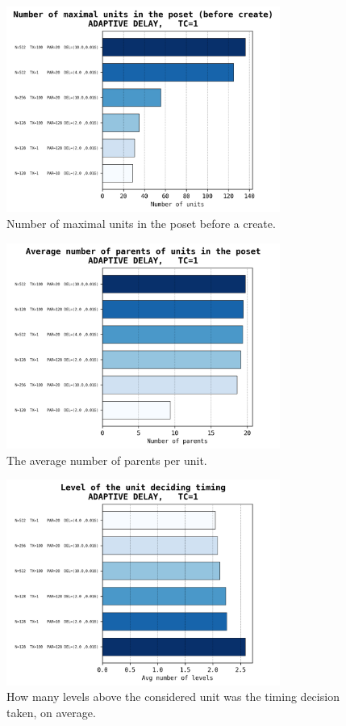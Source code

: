 \documentclass[a4paper,10pt]{article}
\begin{document}
			\begin{figure}[h]
				\centering
				\includegraphics[width=0.8\textwidth]{bar_plots/big/n_maximal.png}
				\caption{Number of maximal units in the poset before a create.}
				\label{fig:bigMaximalPreCreate}
			\end{figure}
			\begin{figure}[h]
				\centering
				\includegraphics[width=0.8\textwidth]{bar_plots/big/n_parents.png}
				\caption{The average number of parents per unit.}
				\label{fig:bigParents}
			\end{figure}
			\begin{figure}[h]
				\centering
				\includegraphics[width=0.8\textwidth]{bar_plots/big/decision_height.png}
				\caption{How many levels above the considered unit was the timing decision taken, on average.}
				\label{fig:bigDecisionUnit}
			\end{figure}
\end{document}
